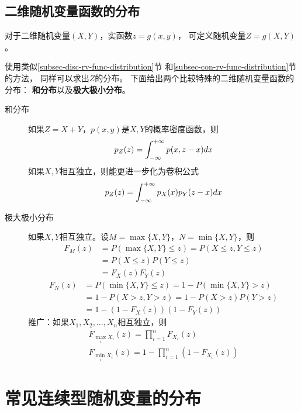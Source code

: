 \subsection{二维随机变量函数的分布}
对于二维随机变量$(X,Y)$，实函数$z=g(x,y)$，
可定义随机变量$Z=g(X,Y)$。

使用类似\ref{subsec-disc-rv-func-distribution}节
和\ref{subsec-con-rv-func-distribution}节的方法，
同样可以求出$Z$的分布。
下面给出两个比较特殊的二维随机变量函数的分布：
\textbf{和分布}以及\textbf{极大极小分布}。

\begin{description}
  \item[和分布]
  如果$Z=X+Y$，$p(x,y)$是$X,Y$的概率密度函数，则
  \begin{displaymath}
    p_Z(z) = \int_{-\infty}^{+\infty} p(x,z-x)dx
  \end{displaymath}
  如果$X,Y$相互独立，则能更进一步化为卷积公式
  \begin{displaymath}
    p_Z(z) = \int_{-\infty}^{+\infty} p_X(x)p_Y(z-x)dx
  \end{displaymath}
  \item[极大极小分布]
  如果$X,Y$相互独立。设$M=\max\{X,Y\}$，$N=\min\{X,Y\}$，则
  \begin{align*}
    F_M(z) &= P(\max\{X,Y\}\le z) = P(X\le z, Y\le z) \\
    &= P(X\le z)P(Y\le z) \\
    &= F_X(z)F_Y(z)
  \end{align*}
  \begin{align*}
    F_N(z) &= P(\min\{X,Y\}\le z) = 1 - P(\min\{X,Y\}>z) \\
    &= 1 - P(X>z,Y>z) = 1 - P(X>z)P(Y>z) \\
    &= 1 - (1-F_X(z))(1-F_Y(z))
  \end{align*}
  推广：如果$X_1,X_2,\dots,X_n$相互独立，则
  \begin{gather*}
    F_{\max_iX_i}(z) = \prod_{i=1}^{n}F_{X_i}(z) \\
    F_{\min_iX_i}(z) = 1-\prod_{i=1}^{n}(1-F_{X_i}(z))
  \end{gather*}
\end{description}

\section{常见连续型随机变量的分布}
